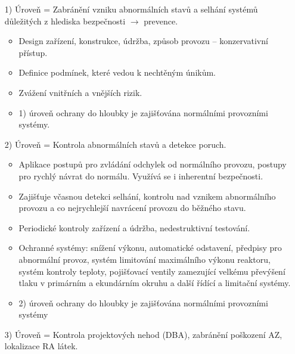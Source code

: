 \begin{itemize}
	\item[1)] Úroveň = Zabránění vzniku abnormálních stavů a selhání systémů důležitých z hlediska bezpečnosti $\rightarrow$ prevence.

        \begin{itemize}
            \item Design zařízení, konstrukce, údržba, způsob provozu -- konzervativní přístup.
            \item Definice podmínek, které vedou k nechtěným únikům.
            \item Zvážení vnitřních a vnějších rizik.
            \item 1) úroveň ochrany do hloubky je zajišťována normálními provozními systémy.
        \end{itemize}

	\item[2)] Úroveň = Kontrola abnormálních stavů a detekce poruch.

        \begin{itemize}
            \item Aplikace postupů pro zvládání odchylek od normálního provozu, postupy pro rychlý návrat do normálu. Využívá se i inherentní bezpečnosti.
            \item Zajišťuje včasnou detekci selhání, kontrolu nad vznikem abnormálního provozu a co nejrychlejší navrácení provozu do běžného stavu.
            \item Periodické kontroly zařízení a údržba, nedestruktivní testování.
            \item Ochranné systémy: snížení výkonu, automatické odstavení, předpisy pro abnormální provoz, systém limitování maximálního výkonu reaktoru, systém kontroly teploty, pojišťovací ventily zamezující velkému převýšení tlaku v primárním a  ekundárním okruhu a další řídící a limitační systémy.
            \item 2) úroveň ochrany do hloubky je zajišťována normálními provozními systémy
        \end{itemize}

	\item[3)] Úroveň =  Kontrola projektových nehod (DBA), zabránění poškození AZ, lokalizace RA látek.
 

\end{itemize}

